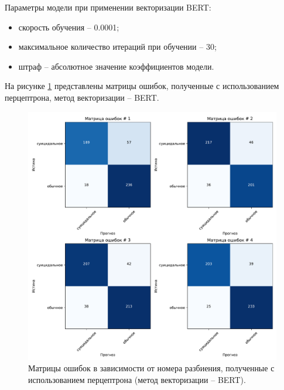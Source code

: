 Параметры модели при применении векторизации BERT:
\begin{itemize}
	\item скорость обучения -- 0.0001;
	\item максимальное количество итераций при обучении -- 30;
	\item штраф -- абсолютное значение коэффициентов модели.
\end{itemize}

На рисунке \ref{img:perceptronMatrBert} представлены матрицы ошибок, полученные с использованием перцептрона, метод векторизации -- BERT.
\begin{figure}[H]
	\centering
	\includegraphics[width=\textwidth]{inc/plots/perceptronMatrBert.pdf}
	\caption{ Матрицы ошибок в зависимости от номера разбиения, полученные с использованием перцептрона (метод векторизации -- BERT). }
	\label{img:perceptronMatrBert}
\end{figure}

